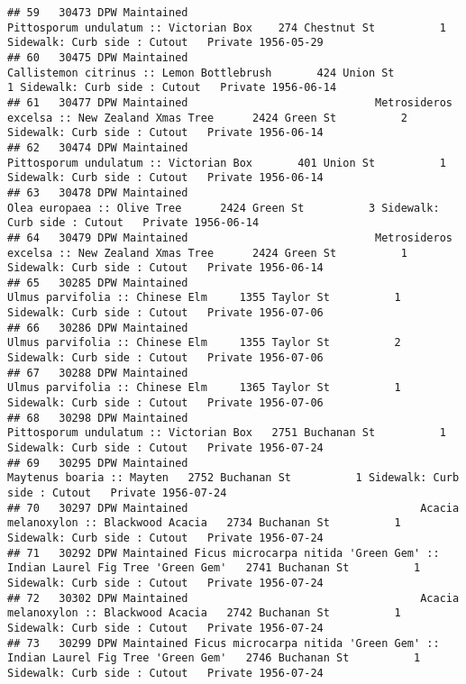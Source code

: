 \documentclass[
]{article}
\begin{document}
\begin{verbatim}
## 59   30473 DPW Maintained                                    Pittosporum undulatum :: Victorian Box    274 Chestnut St          1 Sidewalk: Curb side : Cutout   Private 1956-05-29
## 60   30475 DPW Maintained                                 Callistemon citrinus :: Lemon Bottlebrush       424 Union St          1 Sidewalk: Curb side : Cutout   Private 1956-06-14
## 61   30477 DPW Maintained                             Metrosideros excelsa :: New Zealand Xmas Tree      2424 Green St          2 Sidewalk: Curb side : Cutout   Private 1956-06-14
## 62   30474 DPW Maintained                                    Pittosporum undulatum :: Victorian Box       401 Union St          1 Sidewalk: Curb side : Cutout   Private 1956-06-14
## 63   30478 DPW Maintained                                               Olea europaea :: Olive Tree      2424 Green St          3 Sidewalk: Curb side : Cutout   Private 1956-06-14
## 64   30479 DPW Maintained                             Metrosideros excelsa :: New Zealand Xmas Tree      2424 Green St          1 Sidewalk: Curb side : Cutout   Private 1956-06-14
## 65   30285 DPW Maintained                                           Ulmus parvifolia :: Chinese Elm     1355 Taylor St          1 Sidewalk: Curb side : Cutout   Private 1956-07-06
## 66   30286 DPW Maintained                                           Ulmus parvifolia :: Chinese Elm     1355 Taylor St          2 Sidewalk: Curb side : Cutout   Private 1956-07-06
## 67   30288 DPW Maintained                                           Ulmus parvifolia :: Chinese Elm     1365 Taylor St          1 Sidewalk: Curb side : Cutout   Private 1956-07-06
## 68   30298 DPW Maintained                                    Pittosporum undulatum :: Victorian Box   2751 Buchanan St          1 Sidewalk: Curb side : Cutout   Private 1956-07-24
## 69   30295 DPW Maintained                                                 Maytenus boaria :: Mayten   2752 Buchanan St          1 Sidewalk: Curb side : Cutout   Private 1956-07-24
## 70   30297 DPW Maintained                                    Acacia melanoxylon :: Blackwood Acacia   2734 Buchanan St          1 Sidewalk: Curb side : Cutout   Private 1956-07-24
## 71   30292 DPW Maintained Ficus microcarpa nitida 'Green Gem' :: Indian Laurel Fig Tree 'Green Gem'   2741 Buchanan St          1 Sidewalk: Curb side : Cutout   Private 1956-07-24
## 72   30302 DPW Maintained                                    Acacia melanoxylon :: Blackwood Acacia   2742 Buchanan St          1 Sidewalk: Curb side : Cutout   Private 1956-07-24
## 73   30299 DPW Maintained Ficus microcarpa nitida 'Green Gem' :: Indian Laurel Fig Tree 'Green Gem'   2746 Buchanan St          1 Sidewalk: Curb side : Cutout   Private 1956-07-24

\end{verbatim}
\end{document}
